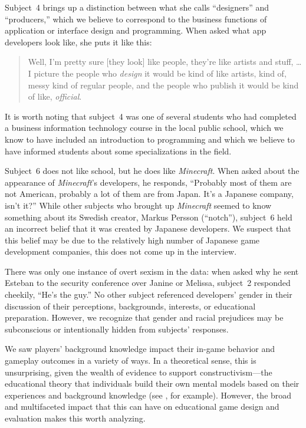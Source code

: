\documentclass[letterpaper]{article}
\begin{document}
Subject~4 brings up a distinction between what she calls ``designers''
and ``producers,'' which we believe to correspond to the business functions
of application or interface design and programming. 
When asked what app developers look like, she puts it like this:
\begin{quote}
Well, I'm pretty sure [they look] like people, they're like artists
and stuff, \ldots{} I picture the people who \textit{design} it would
be kind of like artists, kind of, messy kind of regular people, and the
people who publish it would be kind of like, \textit{official}.
\end{quote}
It is worth noting that subject~4 was one of several students who had
completed a business information technology course in the local public
school, which we know to have included an introduction to programming
and which we believe to have informed students about some
specializations in the field.

Subject~6 does not like school, but he does
like \textit{Minecraft}. When asked about the appearance of \textit{Minecraft}'s
developers, he responds, ``Probably most of them are not American,
probably a lot of them are from Japan. It's a Japanese company, isn't it?''
While other subjects who brought up \textit{Minecraft} seemed to know something
about its Swedish creator, Markus Persson (``notch''), subject~6 held
an incorrect belief that it was created by Japanese developers. 
We suspect that this belief may be due to the relatively high number
of Japanese game development companies, this does not come up in the interview.

There was only one instance of overt sexism in the data:
when asked why he sent Esteban to the security conference over
Janine or Melissa, subject~2 responded cheekily, ``He's the guy.''
No other subject referenced developers' gender in their discussion
of their perceptions, backgrounds, interests, or educational preparation.
However, we recognize that gender and racial prejudices may be
subconscious or intentionally hidden from subjects' responses.




We saw players' background knowledge impact their in-game behavior
and gameplay outcomes in a variety of ways.
In a theoretical sense, this is unsurprising, given the wealth of
evidence to support constructivism---the educational theory that
individuals build their own mental models based on their experiences
and background knowledge (see \citet{Duffy1996}, for example).
However, the broad and multifaceted impact that this can have on
educational game design and evaluation makes this worth analyzing.
\end{document}
